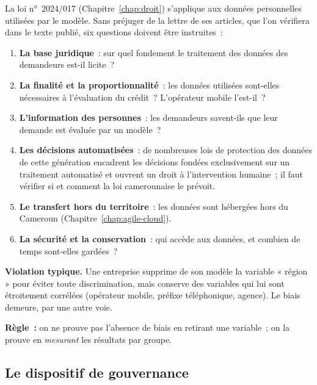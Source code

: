 La loi n°~2024/017 (Chapitre~\ref{chap:droit}) s'applique aux données
personnelles utilisées par le modèle. Sans préjuger de la lettre de ses
articles, que l'on vérifiera dans le texte publié, six questions doivent
être instruites~:
\begin{enumerate}
    \item \textbf{La base juridique}~: sur quel fondement le traitement des
          données des demandeurs est-il licite~?
    \item \textbf{La finalité et la proportionnalité}~: les données utilisées
          sont-elles nécessaires à l'évaluation du crédit~? L'opérateur
          mobile l'est-il~?
    \item \textbf{L'information des personnes}~: les demandeurs savent-ils
          que leur demande est évaluée par un modèle~?
    \item \textbf{Les décisions automatisées}~: de nombreuses lois de
          protection des données de cette génération encadrent les
          décisions fondées exclusivement sur un traitement automatisé et
          ouvrent un droit à l'intervention humaine~; il faut vérifier si
          et comment la loi camerounaise le prévoit.
    \item \textbf{Le transfert hors du territoire}~: les données sont
          hébergées hors du Cameroun (Chapitre~\ref{chap:agile-cloud}).
    \item \textbf{La sécurité et la conservation}~: qui accède aux données,
          et combien de temps sont-elles gardées~?
\end{enumerate}

\begin{boxalert}
\textbf{Violation typique.} Une entreprise supprime de son modèle la
variable « région » pour éviter toute discrimination, mais conserve des
variables qui lui sont étroitement corrélées (opérateur mobile, préfixe
téléphonique, agence). Le biais demeure, par une autre voie.

\smallskip
\textbf{Règle~:} on ne prouve pas l'absence de biais en retirant une
variable~; on la prouve en \emph{mesurant} les résultats par groupe.
\end{boxalert}

\subsection{Le dispositif de gouvernance}

